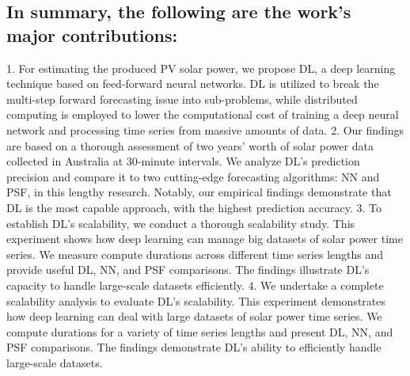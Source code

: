 \documentclass[a4paper,fleqn]{cas-sc}
\begin{document}
\subsection{In summary, the following are the work's major contributions:}
1. For estimating the produced PV solar power, we propose DL, a deep learning technique based on feed-forward neural networks. DL is utilized to break the multi-step forward forecasting issue into sub-problems, while distributed computing is employed to lower the computational cost of training a deep neural network and processing time series from massive amounts of data.
2. Our findings are based on a thorough assessment of two years' worth of solar power data collected in Australia at 30-minute intervals. We analyze DL's prediction precision and compare it to two cutting-edge forecasting algorithms: NN and PSF, in this lengthy research. Notably, our empirical findings demonstrate that DL is the most capable approach, with the highest prediction accuracy.
3. To establish DL's scalability, we conduct a thorough scalability study. This experiment shows how deep learning can manage big datasets of solar power time series. We measure compute durations across different time series lengths and provide useful DL, NN, and PSF comparisons. The findings illustrate DL's capacity to handle large-scale datasets efficiently.
4. We undertake a complete scalability analysis to evaluate DL's scalability. This experiment demonstrates how deep learning can deal with large datasets of solar power time series. We compute durations for a variety of time series lengths and present DL, NN, and PSF comparisons. The findings demonstrate DL's ability to efficiently handle large-scale datasets.
\end{document}

